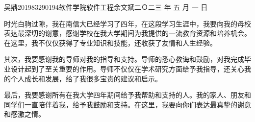 \documentclass[a4paper]{nuist}
\begin{document}
{吴鼎}{201983290194}{软件学院}{软件工程}{余文斌}{二Ｏ二三\hspace{0.4em} 年\hspace{0.4em} 五\hspace{0.4em} 月\hspace{0.4em} 一\hspace{0.4em} 日}

\mytableofcontents













% 
% 
% 
% 
% 
% 
% 


\clearpage %

% 

\thanking
{
    时光白驹过隙，我在南信大已经学习了四年，在这段学习生涯中，我要向我的母校表达最深切的谢意，感谢学校在我大学期间为我提供的一流教育资源和培养机会。在这里，我不仅仅获得了专业知识和技能，还收获了友情和人生经验。

    其次，我要感谢我的导师对我的指导和支持。导师的悉心教诲和鼓励，对我完成毕业设计起到了至关重要的作用。导师不仅仅在学术研究方面给予我指导，还关心我的个人成长和发展，给了我很多宝贵的建议和启示。
    
    最后，我要感谢所有在我大学四年期间给予我帮助和支持的人。我的家人、朋友和同学们一直陪伴着我，给予我鼓励和支持。在这里，我要向你们表达最真挚的谢意和感激之情。
}
\end{document}
